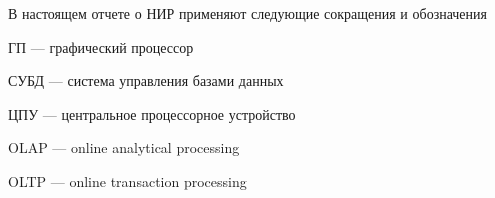 
В настоящем отчете о НИР применяют следующие сокращения и обозначения

\noindent ГП --- графический процессор

\noindent СУБД --- система управления базами данных

\noindent ЦПУ --- центральное процессорное устройство

\noindent OLAP --- online analytical processing

\noindent OLTP --- online transaction processing
